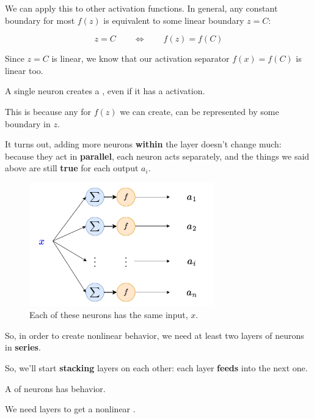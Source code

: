         We can apply this to other activation functions. In general, any constant boundary for most $f(z)$ is equivalent to some linear boundary $z=C$:
        
        \begin{equation}
            z=C 
            \qquad
            \Longleftrightarrow
            \qquad
            f(z)=f(C)
        \end{equation}
        
        Since $z=C$ is linear, we know that our activation separator $f(x)=f(C)$ is linear too.\\
        
        \begin{concept}
            A single neuron creates a , even if it has a  activation.
            
            This is because any  for $f(z)$ we can create, can be represented by some  boundary in $z$.
        \end{concept}
        
        
        It turns out, adding more neurons \textbf{within} the layer doesn't change much: because they act in \textbf{parallel}, each neuron acts separately, and the things we said above are still \textbf{true} for each output $a_i$.
        
        \begin{figure}[H]
            \centering
            \includegraphics[width=80mm,scale=0.4]{images/nn_images/remove_input.png}
            \caption*{Each of these neurons has the same input, $x$.}
        \end{figure}
        
        So, in order to create nonlinear behavior, we need at least two layers of neurons in \textbf{series}.
        
        So, we'll start \textbf{stacking} layers on each other: each layer \textbf{feeds} into the next one.\\
        
        \begin{concept}
            A  of neurons has  behavior.
            
            We need  layers to get a nonlinear .
        \end{concept}